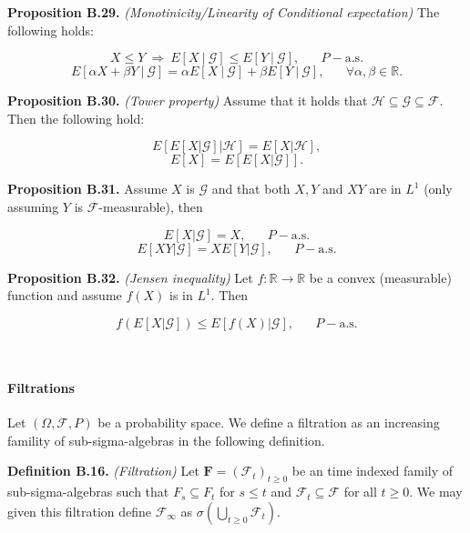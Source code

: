 \documentclass[
]{article}
\begin{document}
\textbf{Proposition B.29.} \emph{(Monotinicity/Linearity of Conditional
expectation)} The following holds:

\[X\le Y\ \Rightarrow\ E[X\ \vert\ \mathcal{G}]\le E[Y\ \vert\ \mathcal{G}],\hspace{20pt}P-\text{a.s.}\]
\[E[\alpha X + \beta Y\ \vert\ \mathcal{G}]=\alpha E[X\ \vert\ \mathcal{G}]+ \beta E[Y\ \vert\ \mathcal{G}],\hspace{20pt}\forall \alpha,\beta\in\mathbb{R}.\]

\textbf{Proposition B.30.} \emph{(Tower property)} Assume that it holds
that \(\mathcal{H}\subseteq\mathcal{G}\subseteq\mathcal{F}\). Then the
following hold:

\[E[E[X\vert \mathcal{G}]\vert\mathcal{H}]=E[X\vert \mathcal{H}],\]
\[E[X]=E[E[X\vert \mathcal{G}]].\]

\textbf{Proposition B.31.} Assume \(X\) is \(\mathcal{G}\) and that both
\(X,Y\) and \(XY\) are in \(L^1\) (only assuming \(Y\) is
\(\mathcal{F}\)-measurable), then

\[E[X\vert\mathcal{G}]=X,\hspace{20pt}P-\text{a.s.}\]
\[E[XY\vert\mathcal{G}]=XE[Y\vert\mathcal{G}],\hspace{20pt}P-\text{a.s.}\]

\textbf{Proposition B.32.} \emph{(Jensen inequality)} Let
\(f:\mathbb{R}\to\mathbb{R}\) be a convex (measurable) function and
assume \(f(X)\) is in \(L^1\). Then

\[f(E[X\vert\mathcal{G}])\le E[f(X)\vert\mathcal{G}],\hspace{20pt}P-\text{a.s.}\]

~

\hypertarget{filtrations}{%
\paragraph{Filtrations}\label{filtrations}}

Let \((\Omega,\mathcal{F},P)\) be a probability space. We define a
filtration as an increasing famility of sub-sigma-algebras in the
following definition.

\textbf{Definition B.16.} \emph{(Filtration)} Let
\(\mathbf{F}=(\mathcal{F}_t)_{t\ge 0}\) be an time indexed family of
sub-sigma-algebras such that \(F_s\subseteq F_t\) for \(s\le t\) and
\(\mathcal{F}_t\subseteq \mathcal{F}\) for all \(t\ge 0\). We may given
this filtration define \(\mathcal{F}_\infty\) as
\(\sigma\left(\bigcup_{t\ge 0}\mathcal{F}_t\right)\).
\end{document}

